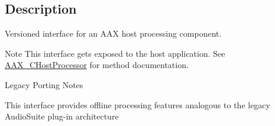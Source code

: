 \subsection{Description}
Versioned interface for an A\+AX host processing component. 

\begin{DoxyNote}{Note}
This interface gets exposed to the host application. See \mbox{\hyperlink{a01485}{A\+A\+X\+\_\+\+C\+Host\+Processor}} for method documentation.
\end{DoxyNote}
\begin{DoxyRefDesc}{Legacy Porting Notes}
\item[\mbox{\hyperlink{a00787__porting_notes000036}{Legacy Porting Notes}}]This interface provides offline processing features analogous to the legacy Audio\+Suite plug-\/in architecture\end{DoxyRefDesc}
